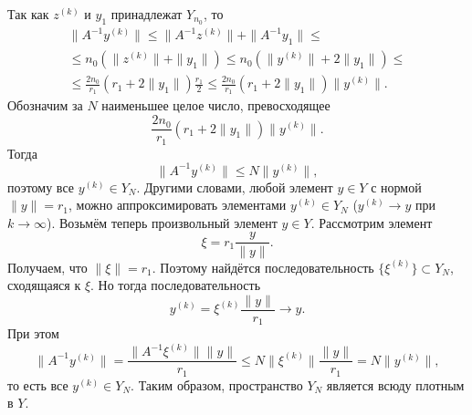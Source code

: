 \documentclass[12pt,a4paper, titlepage]{article}
\begin{document}
Так как $z^{(k)}$ и $y_1$ принадлежат $Y_{n_0}$, то
\begin{multline*}
\|A^{-1} y^{(k)}\| \leqslant \|A^{-1} z^{(k)}\| + \|A^{-1} y_1\| \leqslant \\
\leqslant n_0(\|z^{(k)}\| + \|y_1\|) \leqslant n_0(\|y^{(k)}\| + 2\|y_1\|) \leqslant \\
\leqslant \frac {2n_0} {r_1} (r_1 + 2\|y_1\|) \frac {r_1} 2 \leqslant \frac {2n_0} {r_1} (r_1 + 2 \|y_1\|) \|y^{(k)}\|.
\end{multline*}
Обозначим за $N$ наименьшее целое число, превосходящее
$$
\frac {2n_0} {r_1} (r_1 + 2 \|y_1\|) \|y^{(k)}\|.
$$
Тогда
$$
\|A^{-1} y^{(k)}\| \leqslant N \|y^{(k)}\|,
$$
поэтому все $y^{(k)} \in Y_{N}$. Другими словами, любой элемент $y \in Y$ с нормой $\|y\| = r_1$, можно аппроксимировать элементами $y^{(k)} \in Y_{N}$ ($y^{(k)} \to y$ при $k \to \infty$). Возьмём теперь произвольный элемент $y \in Y$. Рассмотрим элемент
$$
\xi = r_1 \frac y {\|y\|}.
$$
Получаем, что $\|\xi\| = r_1$. Поэтому найдётся последовательность $\lbrace \xi^{(k)} \rbrace \subset Y_{N}$, сходящаяся к $\xi$. Но тогда последовательность
$$
y^{(k)} = \xi^{(k)} \frac {\|y\|}{r_1} \to y.
$$
При этом
$$
\|A^{-1} y^{(k)}\| = \frac{\|A^{-1} \xi^{(k)}\| \|y\|}{r_1} \leqslant N \|\xi^{(k)}\| \frac{\|y\|}{r_1} = N \|y^{(k)}\|,
$$
то есть все $y^{(k)} \in Y_N$. Таким образом, пространство $Y_N$ является всюду плотным в $Y$.\\
\end{document}
